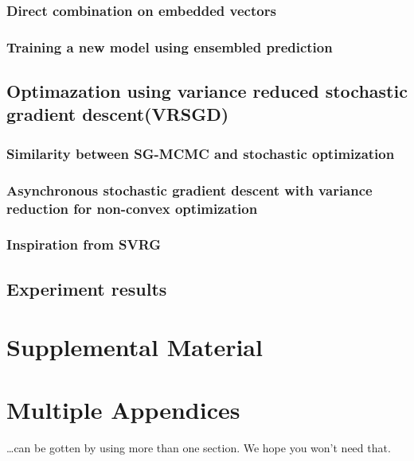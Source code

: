 \documentclass[11pt,a4paper]{article}
\begin{document}
\subsubsection{Direct combination on embedded vectors}
\subsubsection{Training a new model using ensembled prediction}

\subsection{Optimazation using variance reduced stochastic gradient descent(VRSGD)}
\subsubsection{Similarity between SG-MCMC and stochastic optimization}
\subsubsection{Asynchronous stochastic gradient descent with variance reduction for non-convex optimization}
\subsubsection{Inspiration from SVRG}
\subsection{Experiment results}




\appendix

\section{Supplemental Material}
\label{sec:supplemental}

\section{Multiple Appendices}
\dots can be gotten by using more than one section. We hope you won't
need that.
\end{document}
